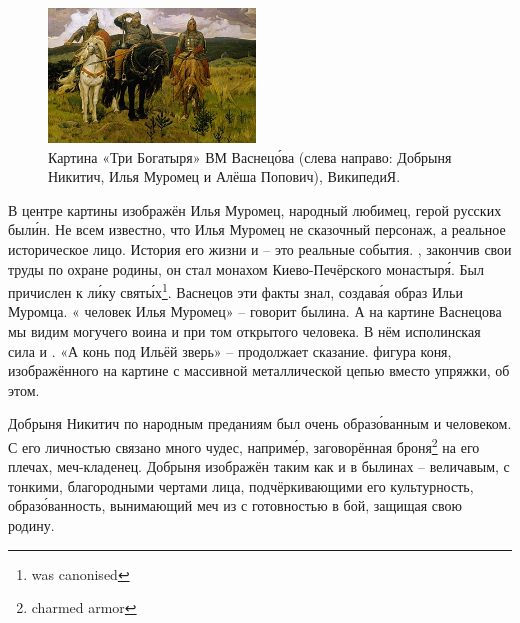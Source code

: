 \begin{figure}
    \begin{center}
        \includegraphics[width=0.49\textwidth]{img/tri_bogatyrya.jpg}
    \end{center}
    \caption{Картина «Три Богатыря» ВМ Васнец\'{о}ва (слева направо: Добрыня Никитич, Илья Муромец и Алёша Попович), ВикипедиЯ.}
\end{figure}
В центре картины изображён Илья Муромец, народный любимец, герой русских был\'{и}н. Не всем известно, что Илья Муромец не сказочный персонаж, а реальное историческое лицо. История его жизни и   -- это реальные события. , закончив свои труды по охране родины, он стал монахом Киево-Печёрского монастыр\'{я}. Был причислен к л\'{и}ку свят\'{ы}х\footnote{was canonised}. Васнецов эти факты знал, создав\'{а}я образ Ильи Муромца. « человек Илья Муромец» -- говорит былина. А на картине Васнецова мы видим могучего воина и при том  открытого человека. В нём  исполинская сила и . «А конь под Ильёй  зверь» -- продолжает сказание.  фигура коня, изображённого на картине с массивной металлической цепью вместо упряжки,  об этом.

Добрыня Никитич по народным преданиям был очень образ\'{о}ванным и  человеком. С его личностью связано много чудес, наприм\'{е}р, заговорённая броня\footnote{charmed armor} на его плечах,  меч-кладенец. Добрыня изображён таким как и в былинах -- величавым, с тонкими, благородными чертами лица, подчёркивающими его культурность, образ\'{о}ванность,  вынимающий меч из  с готовностью  в бой, защищая свою родину.

